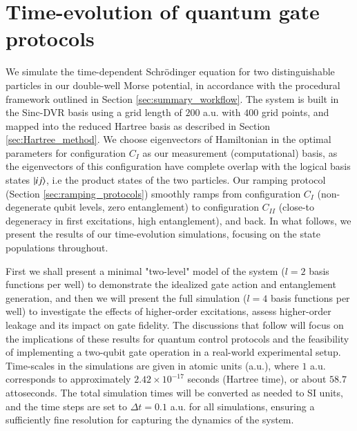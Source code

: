 \documentclass{subfiles}
\begin{document}
\section{Time-evolution of quantum gate protocols}\label{sec:time_evolution}
We simulate the time-dependent Schrödinger equation for two distinguishable particles in our double-well Morse potential, in accordance with the procedural framework outlined in Section \ref{sec:summary_workflow}. The system is built in the Sinc-DVR basis using a grid length of $200$ a.u. with $400$ grid points, and mapped into the reduced Hartree basis as described in Section \ref{sec:Hartree_method}. We choose eigenvectors of Hamiltonian in the optimal parameters for configuration $C_I$ as our measurement (computational) basis, as the eigenvectors of this configuration have complete overlap with the logical basis states $\ket{ij}$, i.e the product states of the two particles. Our ramping protocol (Section \ref{sec:ramping_protocols}) smoothly ramps from configuration $C_I$ (non-degenerate qubit levels, zero entanglement) to configuration $C_{II}$ (close-to degeneracy in first excitations, high entanglement), and back. In what follows, we present the results of our time-evolution simulations, focusing on the state populations throughout. 

First we shall present a minimal "two-level" model of the system ($l=2$ basis functions per well) to demonstrate the idealized gate action and entanglement generation, and then we will present the full simulation ($l=4$ basis functions per well) to investigate the effects of higher-order excitations, assess higher-order leakage and its impact on gate fidelity. The discussions that follow will focus on the implications of these results for quantum control protocols and the feasibility of implementing a two-qubit gate operation in a real-world experimental setup. Time-scales in the simulations are given in atomic units (a.u.), where $1$ a.u. corresponds to approximately $2.42 \times 10^{-17}$ seconds (Hartree time), or about $58.7$ attoseconds. The total simulation times will be converted as needed to SI units, and the time steps are set to $\Delta t = 0.1$ a.u. for all simulations, ensuring a sufficiently fine resolution for capturing the dynamics of the system.
\end{document}
